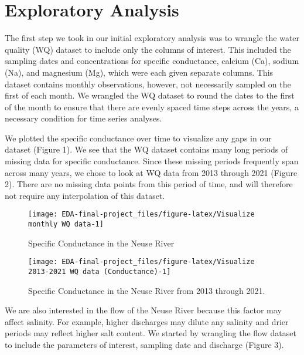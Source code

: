 \documentclass[
  12pt,
]{article}
\begin{document}
\newpage

\hypertarget{exploratory-analysis}{%
\section{Exploratory Analysis}\label{exploratory-analysis}}

The first step we took in our initial exploratory analysis was to
wrangle the water quality (WQ) dataset to include only the columns of
interest. This included the sampling dates and concentrations for
specific conductance, calcium (Ca), sodium (Na), and magnesium (Mg),
which were each given separate columns. This dataset contains monthly
observations, however, not necessarily sampled on the first of each
month. We wrangled the WQ dataset to round the dates to the first of the
month to ensure that there are evenly spaced time steps across the
years, a necessary condition for time series analyses.

We plotted the specific conductance over time to visualize any gaps in
our dataset (Figure 1). We see that the WQ dataset contains many long
periods of missing data for specific conductance. Since these missing
periods frequently span across many years, we chose to look at WQ data
from 2013 through 2021 (Figure 2). There are no missing data points from
this period of time, and will therefore not require any interpolation of
this dataset.

\begin{figure}

\texttt{[image: EDA-final-project\_files/figure-latex/Visualize monthly WQ data-1]} \hfill{}

\caption{Specific Conductance in the Neuse River}\label{fig:Visualize monthly WQ data}
\end{figure}

\begin{figure}

\texttt{[image: EDA-final-project\_files/figure-latex/Visualize 2013-2021 WQ data (Conductance)-1]} \hfill{}

\caption{Specific Conductance in the Neuse River from 2013 through 2021.}\label{fig:Visualize 2013-2021 WQ data (Conductance)}
\end{figure}

\newpage

We are also interested in the flow of the Neuse River because this
factor may affect salinity. For example, higher discharges may dilute
any salinity and drier periods may reflect higher salt content. We
started by wrangling the flow dataset to include the parameters of
interest, sampling date and discharge (Figure 3).
\end{document}
